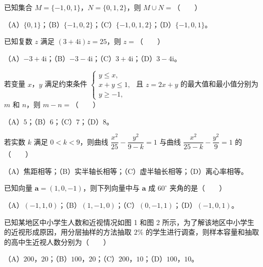 \begin{question}
已知集合 $M=\{-1,0,1\}$，$N=\{0,1,2\}$，则 $M\cup N=$\mbox{（　　）}

（A）$\{0,1\}$；（B）$\{-1,0,2\}$；（C）$\{-1,0,1,2\}$；（D）$\{-1,0,1\}$。

\end{question}
\begin{question}
已知复数 $z$ 满足 $(3+4\mathrm i)z=25$，则 $z=$\mbox{（　　）}

（A）$-3+4\mathrm i$；（B）$-3-4\mathrm i$；（C）$3+4\mathrm i$；（D）$3-4\mathrm i$。

\end{question}
\begin{question}
若变量 $x$，$y$ 满足约束条件 $\begin{cases}y\leqslant x,\\x+y\leqslant 1,\\y\geqslant -1,\end{cases}$ 且 $z=2x+y$ 的最大值和最小值分别为 $m$ 和 $n$，则 $m-n=$\mbox{（　　）}

（A）$5$；（B）$6$；（C）$7$；（D）$8$。

\end{question}
\begin{question}
若实数 $k$ 满足 $0<k<9$，则曲线 $\dfrac{x^2}{25}-\dfrac{y^2}{9-k}=1$ 与曲线 $\dfrac{x^2}{25-k}-\dfrac{y^2}{9}=1$ 的\mbox{（　　）}

（A）焦距相等；（B）实半轴长相等；（C）虚半轴长相等；（D）离心率相等。

\end{question}
\begin{question}
已知向量 $\boldsymbol a=(1,0,-1)$，则下列向量中与 $\boldsymbol a$ 成 $60^\circ$ 夹角的是\mbox{（　　）}

（A）$(-1,1,0)$；（B）$(1,-1,0)$；（C）$(0,-1,1)$；（D）$(-1,0,1)$。

\Needspace{0.4\textheight}
\end{question}
\begin{question}
已知某地区中小学生人数和近视情况如图 1 和图 2 所示，为了解该地区中小学生的近视形成原因，用分层抽样的方法抽取 $2\%$ 的学生进行调查，则样本容量和抽取的高中生近视人数分别为\mbox{（　　）}

（A）$200$，$20$；（B）$100$，$20$；（C）$200$，$10$；（D）$100$，$10$。
\nopagebreak[4]
\begin{center}\end{center}
\nopagebreak[4]
\end{question}
